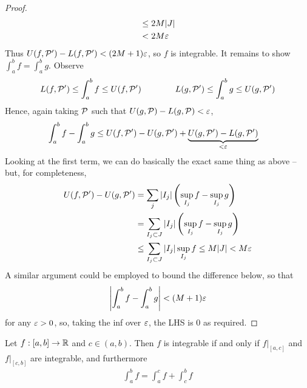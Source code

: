 \documentclass{../../template/note}
\begin{document}
\begin{proof}
\begin{align*}
            &\leq 2M |J| \\
            &< 2M\varepsilon
        \end{align*}
        Thus \(U(f, \mathcal{P}') - L(f, \mathcal{P}') < (2M+1)\varepsilon\), so \(f\) is integrable. It remains to show \(\int_a^b f = \int_a^b g\). Observe
        \begin{align*}
            L(f, \mathcal{P}') \leq \int_a^b f \leq U(f, \mathcal{P}') \qquad \qquad L(g, \mathcal{P}') \leq \int_a^b g \leq U(g, \mathcal{P}')
        \end{align*}
        Hence, again taking \(\mathcal{P}\) such that \(U(g, \mathcal{P}) - L(g, \mathcal{P}) < \varepsilon\),
        \begin{align*}
            \int_a^b f - \int_a^b g &\leq U(f, \mathcal{P}') - U(g, \mathcal{P}') + \underbrace{U(g, \mathcal{P}') - L(g, \mathcal{P}')}_{< \varepsilon}
        \end{align*}
        Looking at the first term, we can do basically the exact same thing as above -- but, for completeness,
        \begin{align*}
            U(f, \mathcal{P}') - U(g, \mathcal{P}') &= \sum_j |I_j| \left(\sup_{I_j}f - \sup_{I_j}g\right) \\
            &= \sum_{I_j \subset J} |I_j| \left(\sup_{I_j}f - \sup_{I_j}g\right) \\
            &\leq \sum_{I_j \subset J} |I_j| \sup_{I_j}f 
            \leq M|J| < M\varepsilon
        \end{align*}
        A similar argument could be employed to bound the difference below, so that
        \begin{align*}
            \left|\int_a^b f - \int_a^b g\right| < (M+1)\varepsilon 
        \end{align*}
        for any \(\varepsilon > 0\), so, taking the inf over \(\varepsilon\), the LHS is 0 as required.
    \end{proof}
    

    \begin{proposition}
        \label{additivity-integrals}
        Let \(f: [a, b] \to \mathbb R\) and \(c \in (a, b)\). Then \(f\) is integrable if and only if \(\left.f\right|_{[a,c]}\) and \(\left.f\right|_{[c,b]}\) are integrable, and furthermore
        \begin{align*}
            \int_a^b f = \int_a^c f + \int_c^b f
        \end{align*}
    \end{proposition}
    
\end{document}
